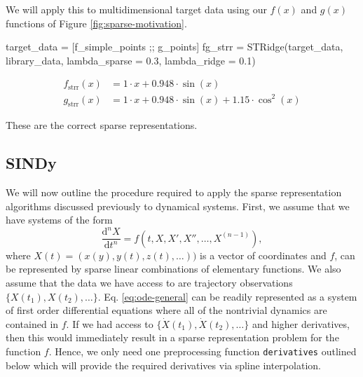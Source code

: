 \documentclass[
]{article}
\newenvironment{Shaded}{\begin{snugshade}}{\end{snugshade}}
\newcommand{\FloatTok}[1]{\textcolor[rgb]{0.68,0.00,0.00}{#1}}
\newcommand{\FunctionTok}[1]{\textcolor[rgb]{0.28,0.35,0.67}{#1}}
\newcommand{\NormalTok}[1]{\textcolor[rgb]{0.00,0.23,0.31}{#1}}
\newcommand{\OperatorTok}[1]{\textcolor[rgb]{0.37,0.37,0.37}{#1}}
\begin{document}
We will apply this to multidimensional target data using our \(f(x)\)
and \(g(x)\) functions of Figure \ref{fig:sparse-motivation}.

\begin{Shaded}
\begin{Highlighting}[]
\NormalTok{target\_data }\OperatorTok{=}\NormalTok{ [f\_simple\_points ;; g\_points]}
\NormalTok{fg\_strr }\OperatorTok{=} \FunctionTok{STRidge}\NormalTok{(target\_data, library\_data, lambda\_sparse }\OperatorTok{=} \FloatTok{0.3}\NormalTok{, lambda\_ridge }\OperatorTok{=} \FloatTok{0.1}\NormalTok{)}
\end{Highlighting}
\end{Shaded}

\begin{subequations} \label{eq:g-strr} \begin{align}    f_{\text{strr}}(x) &= 1 \cdot x + 0.948 \cdot \sin\left( x \right) \\
  g_{\text{strr}}(x) &= 1 \cdot x + 0.948 \cdot \sin\left( x \right) + 1.15 \cdot \cos^{2}\left( x \right) \end{align} \end{subequations}

These are the correct sparse representations.

\subsection{SINDy}\label{sindy}

We will now outline the procedure required to apply the sparse
representation algorithms discussed previously to dynamical systems.
First, we assume that we have systems of the form
\begin{equation} \label{eq:ode-general}
\frac{\text{d}^n X}{\text{d}t^n} = f(t, X,  X', X'', \dots, X^{(n - 1)}),
\end{equation} where \(X(t) = (x(y), y(t), z(t),  \dots))\) is a vector
of coordinates and \(f\), can be represented by sparse linear
combinations of elementary functions. We also assume that the data we
have access to are trajectory observations
\(\{X(t_1), X(t_2), \dots \}\). Eq. \eqref{eq:ode-general} can be
readily represented as a system of first order differential equations
where all of the nontrivial dynamics are contained in \(f\). If we had
access to \(\{\dot{X}(t_1), \dot{X}(t_2), \dots \}\) and higher
derivatives, then this would immediately result in a sparse
representation problem for the function \(f\). Hence, we only need one
preprocessing function \texttt{derivatives} outlined below which will
provide the required derivatives via spline interpolation.
\end{document}
